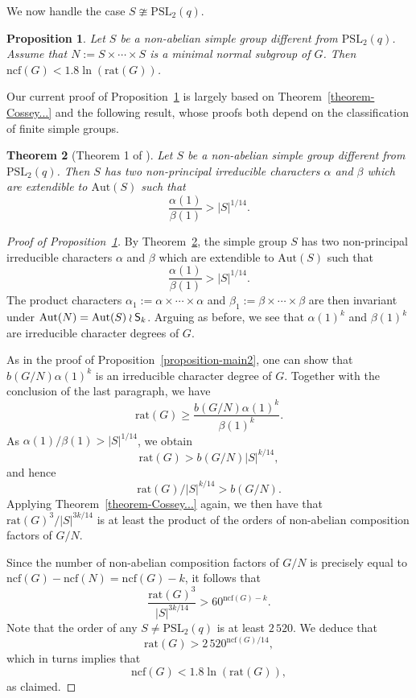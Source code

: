 \documentclass[12pt]{amsart}
\newtheorem{theorem}{Theorem}
\newtheorem{proposition}[theorem]{Proposition}
\theoremstyle{definition}
\theoremstyle{remark}
\begin{document}
We now handle the case $S\ncong {{\mathrm {PSL}}}_2(q)$.

\begin{proposition}\label{proposition-main3} Let $S$ be a non-abelian simple group different from ${{\mathrm {PSL}}}_2(q)$.
Assume that $N:=S\times\cdots\times S$ is a minimal normal subgroup
of $G$. Then ${{\mathrm {ncf}}}(G)<1.8\ln({{\mathrm {rat}}}(G))$.
\end{proposition}

Our current proof of Proposition~\ref{proposition-main3} is largely
based on Theorem~\ref{theorem-Cossey...} and the following result,
whose proofs both depend on the classification of finite simple
groups.

\begin{theorem}[Theorem 1 of \cite{Cossey-Nguyen}]\label{theorem-extending-character} Let $S$ be a non-abelian simple
group different from ${{\mathrm {PSL}}}_2(q)$. Then $S$ has two non-principal
irreducible characters $\alpha$ and $\beta$ which are extendible to
${{\mathrm {Aut}}}(S)$ such that
\[\frac{\alpha(1)}{\beta(1)}>|S|^{1/14}.\]
\end{theorem}

\begin{proof}[Proof of Proposition~\ref{proposition-main3}] By Theorem~\ref{theorem-extending-character}, the simple group $S$
has two non-principal irreducible characters $\alpha$ and $\beta$
which are extendible to ${{\mathrm {Aut}}}(S)$ such that
$$\frac{\alpha(1)}{\beta(1)}>|S|^{1/14}.$$ The product
characters $\alpha_1:=\alpha \times \cdots \times \alpha$ and
$\beta_1:=\beta \times \cdots \times \beta$ are then invariant under
${{\mathrm {Aut}}}(N)={{\mathrm {Aut}}}(S)\wr {\textup{\textsf{S}}}_k$. Arguing as before, we see that
$\alpha(1)^k$ and $\beta(1)^k$ are irreducible character degrees of
$G$.

As in the proof of Proposition~\ref{proposition-main2}, one can show
that $b(G/N)\alpha(1)^k$ is an irreducible character degree of $G$.
Together with the conclusion of the last paragraph, we have
\[{{\mathrm {rat}}}(G)\geq
\frac{b(G/N)\alpha(1)^k}{\beta(1)^k}.\] As
$\alpha(1)/\beta(1)>|S|^{1/14}$, we obtain
\[{{\mathrm {rat}}}(G)>b(G/N)|S|^{k/14},\] and hence
\[{{\mathrm {rat}}}(G)/|S|^{k/14}>b(G/N).\]
Applying Theorem~\ref{theorem-Cossey...} again, we then have that
${{\mathrm {rat}}}(G)^3/|S|^{3k/14}$ is at least the product of the orders of
non-abelian composition factors of $G/N$.

Since the number of non-abelian composition factors of $G/N$ is
precisely equal to ${{\mathrm {ncf}}}(G)-{{\mathrm {ncf}}}(N)={{\mathrm {ncf}}}(G)-k$, it follows that
\[\frac{{{\mathrm {rat}}}(G)^3}{|S|^{3k/14}}>{60}^{{{\mathrm {ncf}}}(G)-k}.\] Note that the order of any
$S\neq {{\mathrm {PSL}}}_2(q)$ is at least $2\,520$. We deduce that
\[{{\mathrm {rat}}}(G)> 2\,520^{{{\mathrm {ncf}}}(G)/14},\] which in turns implies that
\[{{\mathrm {ncf}}}(G)<1.8\ln({{\mathrm {rat}}}(G)),\] as claimed.

\end{proof}
\end{document}

